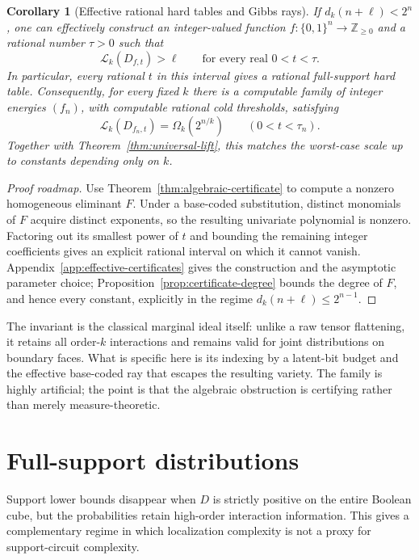 \documentclass{article}
\newcommand{\LC}{\mathcal{L}}
\newcommand{\bits}{\{0,1\}}
\newtheorem{corollary}{Corollary}
\begin{document}
\begin{corollary}[Effective rational hard tables and Gibbs rays]
\label{cor:effective-tables}
If $d_k(n+\ell)<2^n$, one can effectively construct an integer-valued function
$f:\bits^n\to\mathbb Z_{\ge0}$ and a rational number $\tau>0$ such that
\[
  \LC_k(D_{f,t})>\ell
  \qquad\text{for every real }0<t<\tau.
\]
In particular, every rational $t$ in this interval gives a rational
full-support hard table.  Consequently, for every fixed $k$ there is a
computable family of integer energies $(f_n)$, with computable rational cold
thresholds, satisfying
\[
  \LC_k(D_{f_n,t})=\Omega_k(2^{n/k})
  \qquad(0<t<\tau_n).
\]
Together with Theorem~\ref{thm:universal-lift}, this matches the worst-case
scale up to constants depending only on $k$.
\end{corollary}

\begin{proof}[Proof roadmap]
Use Theorem~\ref{thm:algebraic-certificate} to compute a nonzero homogeneous
eliminant $F$.  Under a base-coded substitution, distinct monomials of $F$
acquire distinct exponents, so the resulting univariate polynomial is
nonzero.  Factoring out its smallest power of $t$ and bounding the remaining
integer coefficients gives an explicit rational interval on which it cannot
vanish.
Appendix~\ref{app:effective-certificates} gives the construction and the
asymptotic parameter choice; Proposition~\ref{prop:certificate-degree} bounds
the degree of $F$, and hence every constant, explicitly in the regime
$d_k(n+\ell)\le2^{n-1}$.
\end{proof}

The invariant is the classical marginal ideal itself: unlike a raw tensor
flattening, it retains all order-$k$ interactions and remains valid for joint
distributions on boundary faces.  What is specific here is its indexing by a
latent-bit budget and the effective base-coded ray that escapes the resulting
variety.  The family is highly artificial; the point is that the algebraic
obstruction is certifying rather than merely measure-theoretic.

\section{Full-support distributions}\label{sec:full-support}

Support lower bounds disappear when $D$ is strictly positive on the entire
Boolean cube, but the probabilities retain high-order interaction information.
This gives a complementary regime in which localization complexity is not a
proxy for support-circuit complexity.
\end{document}
